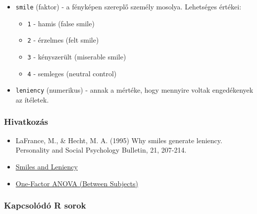 \documentclass[
]{book}
\providecommand{\tightlist}{%
  \setlength{\itemsep}{0pt}\setlength{\parskip}{0pt}}
\begin{document}
\begin{itemize}
\tightlist
\item
  \texttt{smile} (faktor) - a fényképen szereplő személy mosolya. Lehetséges értékei:

  \begin{itemize}
  \tightlist
  \item
    \texttt{1} - hamis (false smile)
  \item
    \texttt{2} - érzelmes (felt smile)
  \item
    \texttt{3} - kényszerült (miserable smile)
  \item
    \texttt{4} - semleges (neutral control)
  \end{itemize}
\item
  \texttt{leniency} (numerikus) - annak a mértéke, hogy mennyire voltak engedékenyek az ítéletek.
\end{itemize}

\hypertarget{hivatkozuxe1s}{%
\subsubsection*{Hivatkozás}\label{hivatkozuxe1s}}

\begin{itemize}
\tightlist
\item
  LaFrance, M., \& Hecht, M. A. (1995) Why smiles generate leniency. Personality and Social Psychology Bulletin, 21, 207-214.
\item
  \href{https://onlinestatbook.com/2/case_studies/leniency.html}{Smiles and Leniency}
\item
  \href{https://onlinestatbook.com/2/analysis_of_variance/one-way.html}{One-Factor ANOVA (Between Subjects)}
\end{itemize}

\hypertarget{kapcsoluxf3duxf3-r-sorok}{%
\subsubsection*{Kapcsolódó R sorok}\label{kapcsoluxf3duxf3-r-sorok}}
\end{document}
